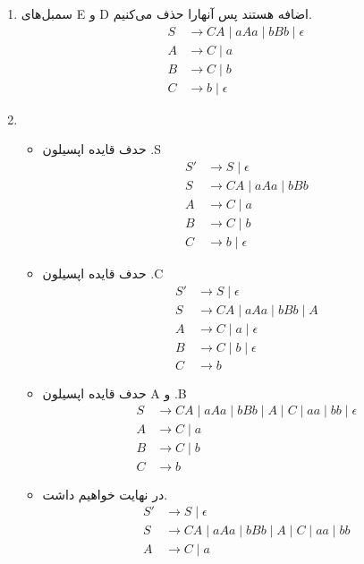 \begin{enumerate}
	\item {سمبل‌های E و D اضافه هستند پس آنهارا حذف می‌کنیم.}
	\[
	\begin{aligned}
		S &\rightarrow CA \mid aAa \mid bBb \mid \epsilon \\
		A &\rightarrow C \mid a \\
		B &\rightarrow C \mid b \\
		C &\rightarrow b \mid \epsilon
	\end{aligned}
	\]
	\item 
	\begin{itemize}
		\item {حدف قایده اپسیلون .S}
		\[
		\begin{aligned}
			S' &\rightarrow S \mid \epsilon \\
			S &\rightarrow CA \mid aAa \mid bBb \\
			A &\rightarrow C \mid a \\
			B &\rightarrow C \mid b \\
			C &\rightarrow b \mid \epsilon
		\end{aligned}
		\]
		\item {حدف قایده اپسیلون .C}
		\[
		\begin{aligned}
			S' &\rightarrow S \mid \epsilon \\
			S &\rightarrow CA \mid aAa \mid bBb \mid A \\
			A &\rightarrow C \mid a \mid \epsilon \\
			B &\rightarrow C \mid b \mid \epsilon \\
			C &\rightarrow b
		\end{aligned}
		\]
		\item {حدف قایده اپسیلون A و .B}
		\[
		\begin{aligned}
			S &\rightarrow CA \mid aAa \mid bBb \mid A \mid C \mid aa \mid bb \mid \epsilon \\
			A &\rightarrow C \mid a \\
			B &\rightarrow C \mid b \\
			C &\rightarrow b
		\end{aligned}
		\]
		\item {در نهایت خواهیم داشت.}
		\[
		\begin{aligned}
			S' &\rightarrow S \mid \epsilon \\
			S &\rightarrow CA \mid aAa \mid bBb \mid A \mid C \mid aa \mid bb \\
			A &\rightarrow C \mid a \\

\end{aligned}\]
\end{itemize}
\end{enumerate}
